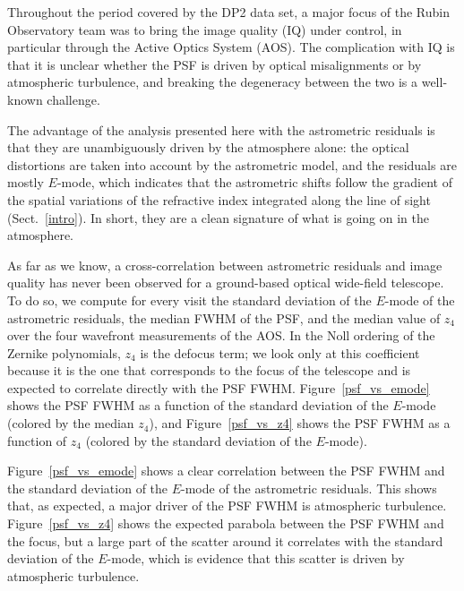 Throughout the period covered by the DP2 data set, a major focus of the Rubin Observatory team was to bring the image quality (IQ) under control, 
in particular through the Active Optics System (AOS).
The complication with IQ is that it is unclear whether the PSF is driven by optical misalignments or by atmospheric turbulence, and breaking the 
degeneracy between the two is a well-known challenge.

The advantage of the analysis presented here with the astrometric residuals is that they are unambiguously driven by the atmosphere alone: the optical 
distortions are taken into account by the astrometric model, and the residuals are mostly $E$-mode, which indicates that the astrometric shifts follow 
the gradient of the spatial variations of the refractive index integrated along the line of sight (Sect.~\ref{intro}).
In short, they are a clean signature of what is going on in the atmosphere.

As far as we know, a cross-correlation between astrometric residuals and image quality has never been observed for a ground-based optical wide-field telescope.
To do so, we compute for every visit the standard deviation of the $E$-mode of the astrometric residuals, the median FWHM of the PSF, and the median value of 
$z_4$ over the four wavefront measurements of the AOS.
In the Noll ordering of the Zernike polynomials, $z_4$ is the defocus term; we look only at this coefficient because it is the one that corresponds to the focus 
of the telescope and is expected to correlate directly with the PSF FWHM.
Figure~\ref{psf_vs_emode} shows the PSF FWHM as a function of the standard deviation of the $E$-mode (colored by the median $z_4$), and Figure~\ref{psf_vs_z4} 
shows the PSF FWHM as a function of $z_4$ (colored by the standard deviation of the $E$-mode).

Figure~\ref{psf_vs_emode} shows a clear correlation between the PSF FWHM and the standard deviation of the $E$-mode of the astrometric residuals.
This shows that, as expected, a major driver of the PSF FWHM is atmospheric turbulence.
Figure~\ref{psf_vs_z4} shows the expected parabola between the PSF FWHM and the focus, but a large part of the scatter around it correlates with the standard 
deviation of the $E$-mode, which is evidence that this scatter is driven by atmospheric turbulence.

